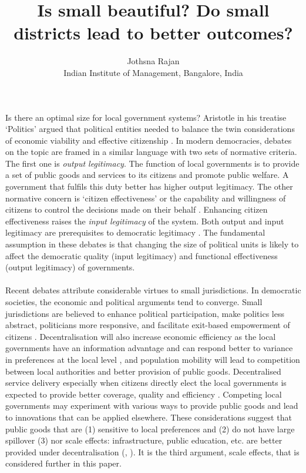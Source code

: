 \documentclass[12pt, a4paper]{article}
\title{Is small beautiful? Do small districts lead to better outcomes?}
\author{Jothsna Rajan \\
	\small{Indian Institute of Management, Bangalore, India}}
\begin{document}
	\maketitle
\paragraph{} Is there an optimal size for local government systems? Aristotle in his treatise `Politics' argued that political entities needed to balance the twin considerations of economic viability and effective citizenship \parencite{aristotle_politics_1984}. In modern democracies, debates on the topic are framed in a similar language with two sets of normative criteria. The first one is \textit{output legitimacy}. The function of local governments is to provide a set of public goods and services to its citizens and promote public welfare. A government that fulfils this duty better has higher output legitimacy. The other normative concern is `citizen effectiveness' or the capability and willingness of citizens to control the decisions made on their behalf \parencite{dahl_size_1973}. Enhancing citizen effectiveness raises the \textit{input legitimacy} of the system. Both output and input legitimacy are prerequisites to democratic legitimacy \parencite{scharpf_governing_1999}. The fundamental assumption in these debates is that changing the size of political units is likely to affect the democratic quality (input legitimacy) and functional effectiveness (output legitimacy) of governments.
\paragraph{} Recent debates attribute considerable virtues to small jurisdictions. In democratic societies, the economic and political arguments tend to converge. Small jurisdictions are believed to enhance political participation, make politics less abstract, politicians more responsive, and facilitate exit-based empowerment of citizens \parencite{hansen_size_2014}. Decentralisation will also increase economic efficiency as the local governments have an information advantage and can respond better to variance in preferences at the local level \parencite{oates_fiscal_1972}, and population mobility will lead to competition between local authorities and better provision of public goods. Decentralised service delivery especially when citizens directly elect the local governments is expected to provide better coverage, quality and efficiency \parencite{smoke2015rethinking}. Competing local governments may experiment with various ways to provide public goods and lead to innovations that can be applied elsewhere. These considerations suggest that public goods that are (1) sensitive to local preferences and (2) do not have large spillover (3) nor scale effects: infrastructure, public education, etc. are better provided under decentralisation (\cite{tiebout_economies_1960}, \cite{oates_fiscal_1972}). It is the third argument, scale effects, that is considered further in this paper.
\end{document}
